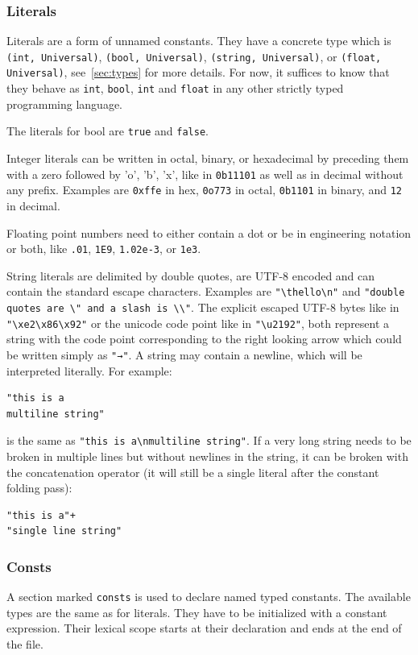 \documentclass[a4paper]{article}
\begin{document}
\subsubsection{Literals\label{sec:literals}}

Literals are a form of unnamed constants. They have a concrete type which is
\verb+(int, Universal)+, \verb+(bool, Universal)+, \verb+(string, Universal)+, or
\verb+(float, Universal)+, see~\ref{sec:types} for more details. For now, it suffices to know
that they behave as \verb+int+, \verb+bool+, \verb+int+ and \verb+float+  in any other
strictly typed programming language.

The literals for bool are \verb+true+ and \verb+false+.

Integer literals can be written in octal,
binary, or hexadecimal by preceding them with a zero followed by 'o', 'b',
'x', like in \verb+0b11101+ as well as in decimal without any prefix.
Examples are \verb+0xffe+ in hex,
\verb+0o773+ in octal, \verb+0b1101+ in binary, and \verb+12+ in decimal.

Floating point numbers need to either contain a dot or be in engineering notation
or both, like \verb+.01+, \verb+1E9+, \verb+1.02e-3+, or \verb+1e3+.

String literals are delimited by double quotes, are UTF-8 encoded and can
contain the standard escape characters. Examples are \verb+"\thello\n"+ and
\verb+"double quotes are \" and a slash is \\"+. The explicit escaped UTF-8 bytes like in
\verb+"\xe2\x86\x92"+ or the unicode code point like in \verb+"\u2192"+, both
represent a string with the code point corresponding to the right looking
arrow which could be written simply as \verb+"→"+. A string may contain
a newline, which will be interpreted literally. For example:
\begin{verbatim}
"this is a
multiline string"
\end{verbatim}
is the same as \verb+"this is a\nmultiline string"+.
If a very long string needs to be broken in multiple lines but without
newlines in the string, it can be broken with the concatenation operator
(it will still be a single literal after the constant folding pass):
\begin{verbatim}
"this is a"+
"single line string"
\end{verbatim}

\subsubsection{Consts}
A section marked \texttt{consts} is used to declare named typed constants.
The available types are the same as for literals.
They have to be initialized with a constant expression. Their lexical scope
starts  at their declaration and ends at the end of the file.
\end{document}
